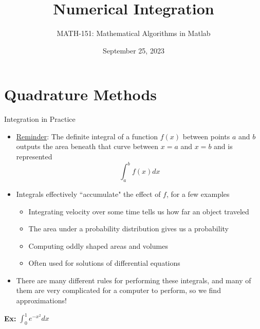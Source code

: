 {}\documentclass[letterpaper,
compress,
xcolor=x11names,
]{beamer}
\begin{document}
	\title{Numerical Integration}
	\author{MATH-151:  Mathematical Algorithms in Matlab}
	\date[202X]{September 25, 2023}




\begin{frame}
\titlepage
\end{frame}
\section{Quadrature Methods}

\begin{frame}{Integration in Practice}
	\footnotesize
	\begin{itemize}
		\item \underline{Reminder}: The definite integral of a function $f(x)$ between points $a$ and $b$ outputs the area beneath that curve between $x=a$ and $x=b$ and is represented 
		\begin{equation*}
			\int_{a}^{b}f(x)dx
		\end{equation*}
		\item Integrals effectively ``accumulate" the effect of $f$, for a few examples
		\begin{itemize}
			\item Integrating velocity over some time tells us how far an object traveled
			\item The area under a probability distribution gives us a probability
			\item Computing oddly shaped areas and volumes
			\item Often used for solutions of differential equations
		\end{itemize}
		\item There are many different rules for performing these integrals, and many of them are very complicated for a computer to perform, so we find approximations!
	\end{itemize}
	\begin{center}
		\textbf{Ex:} $\displaystyle \int_{0}^{1} e^{-x^2} dx$ \hspace{0.5cm}
	\end{center}
\end{frame}
\end{document}
